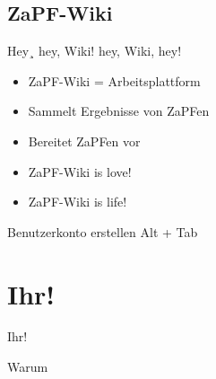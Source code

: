 \documentclass[compress,]{beamer}
\begin{document}

\subsection{ZaPF-Wiki}

\begin{frame}{Hey¸ hey, Wiki! hey, Wiki, hey!}

  \begin{itemize}
  \item<1-> ZaPF-Wiki = Arbeitsplattform
  \item<2-> Sammelt Ergebnisse von ZaPFen
  \item<3-> Bereitet ZaPFen vor
  \item<4-> \Huge{ZaPF-Wiki is love!}
  \item<4-> \Huge{ZaPF-Wiki is life!}
  \end{itemize}

\end{frame}

\begin{frame}{Benutzerkonto erstellen}
  \centering
  \Huge{Alt + Tab}

\end{frame}


\section{Ihr!}

\begin{frame}{Ihr!}

  Warum

\end{frame}
\end{document}
